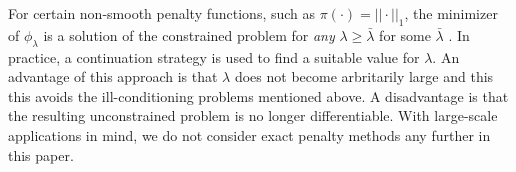 \documentclass{iopart}
\begin{document}
For certain non-smooth penalty functions, such as $\pi(\cdot) = ||\cdot||_1$, the minimizer of $\phi_{\lambda}$
is a solution of the constrained problem for \emph{any} $\lambda \geq \bar{\lambda}$ for some $\bar{\lambda}$
\cite[Thm. 17.3]{Nocedal}. In practice, a continuation
strategy is used to find a suitable value for $\lambda$. An advantage of this approach is that $\lambda$ does
not become arbritarily large and this this avoids the ill-conditioning problems mentioned above. A disadvantage
is that the resulting unconstrained problem is no longer differentiable. 
With large-scale applications in mind, we do not consider exact penalty methods any further in this paper.

\end{document}
